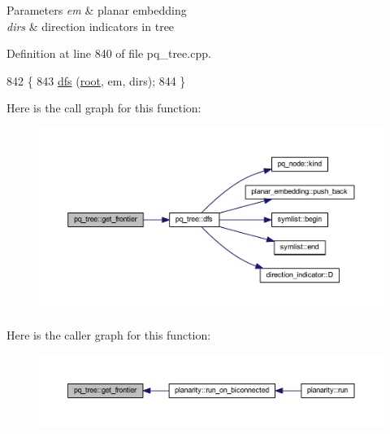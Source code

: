 \begin{DoxyParams}{Parameters}
{\em em} & planar embedding \\
\hline
{\em dirs} & direction indicators in tree \\
\hline
\end{DoxyParams}


Definition at line 840 of file pq\+\_\+tree.\+cpp.


\begin{DoxyCode}
842 \{
843     \mbox{\hyperlink{classpq__tree_a60d97d712c79b072693f75de3f0d328e}{dfs}} (\mbox{\hyperlink{classpq__tree_ad8e4e2235fe68fb99769cec54e1760ba}{root}}, em, dirs);
844 \}
\end{DoxyCode}
Here is the call graph for this function\+:\nopagebreak
\begin{figure}[H]
\begin{center}
\leavevmode
\includegraphics[width=350pt]{classpq__tree_a7b4e6037469858019336255cdbd38fa1_cgraph}
\end{center}
\end{figure}
Here is the caller graph for this function\+:\nopagebreak
\begin{figure}[H]
\begin{center}
\leavevmode
\includegraphics[width=350pt]{classpq__tree_a7b4e6037469858019336255cdbd38fa1_icgraph}
\end{center}
\end{figure}
\mbox{\label{classpq__tree_a170813af06d7b02083c3a7785e080de5}} 
